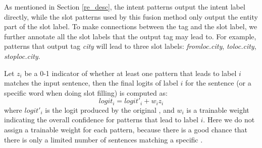 As mentioned in Section \ref{re_desc}, the intent \RE patterns output the intent label directly, while the slot \RE patterns used by this fusion method only output the entity part of the slot label. To make connections between the \RE tag and the slot label, we further annotate all the slot labels that the output tag may lead to. For example, patterns that output tag \emph{city} will lead to three slot labels: \emph{fromloc.city}, \emph{toloc.city}, \emph{stoploc.city}.

Let $z_i$ be a 0-1 indicator of whether at least one \RE pattern that leads to label $i$ matches the input sentence, then the final logits of label $i$ for the sentence (or a specific word when doing slot filling) is computed as: 
\begin{equation}
logit_i = logit'_i + w_i z_i
\end{equation}
where $logit'_i$ is the logit produced by the original \NN, and $w_i$ is a trainable weight indicating the overall confidence for patterns that lead to label $i$. Here we do not assign a trainable weight for each pattern, because there is a good chance that there is only a limited number of sentences matching a specific \RE. 


